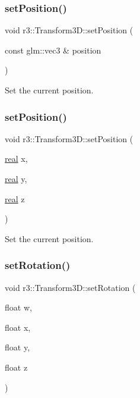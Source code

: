 \mbox{\label{classr3_1_1_transform3_d_a24bf42a0f16e38b66bd6a3ecf4f026c4}} 
\subsubsection{\texorpdfstring{set\+Position()}{setPosition()}\hspace{0.1cm}{\footnotesize\ttfamily [1/2]}}
{\footnotesize\ttfamily void r3\+::\+Transform3\+D\+::set\+Position (\begin{DoxyParamCaption}\item[{const glm\+::vec3 \&}]{position }\end{DoxyParamCaption})}

Set the current position. \mbox{\label{classr3_1_1_transform3_d_adae3a3bf01667c1c6c67d9a817d03a77}} 
\subsubsection{\texorpdfstring{set\+Position()}{setPosition()}\hspace{0.1cm}{\footnotesize\ttfamily [2/2]}}
{\footnotesize\ttfamily void r3\+::\+Transform3\+D\+::set\+Position (\begin{DoxyParamCaption}\item[{\mbox{\hyperlink{namespacer3_ab2016b3e3f743fb735afce242f0dc1eb}{real}}}]{x,  }\item[{\mbox{\hyperlink{namespacer3_ab2016b3e3f743fb735afce242f0dc1eb}{real}}}]{y,  }\item[{\mbox{\hyperlink{namespacer3_ab2016b3e3f743fb735afce242f0dc1eb}{real}}}]{z }\end{DoxyParamCaption})}

Set the current position. \mbox{\label{classr3_1_1_transform3_d_a78c34c186d255ad6dcd0adf7ce199c4e}} 
\subsubsection{\texorpdfstring{set\+Rotation()}{setRotation()}\hspace{0.1cm}{\footnotesize\ttfamily [1/2]}}
{\footnotesize\ttfamily void r3\+::\+Transform3\+D\+::set\+Rotation (\begin{DoxyParamCaption}\item[{float}]{w,  }\item[{float}]{x,  }\item[{float}]{y,  }\item[{float}]{z }\end{DoxyParamCaption})}

